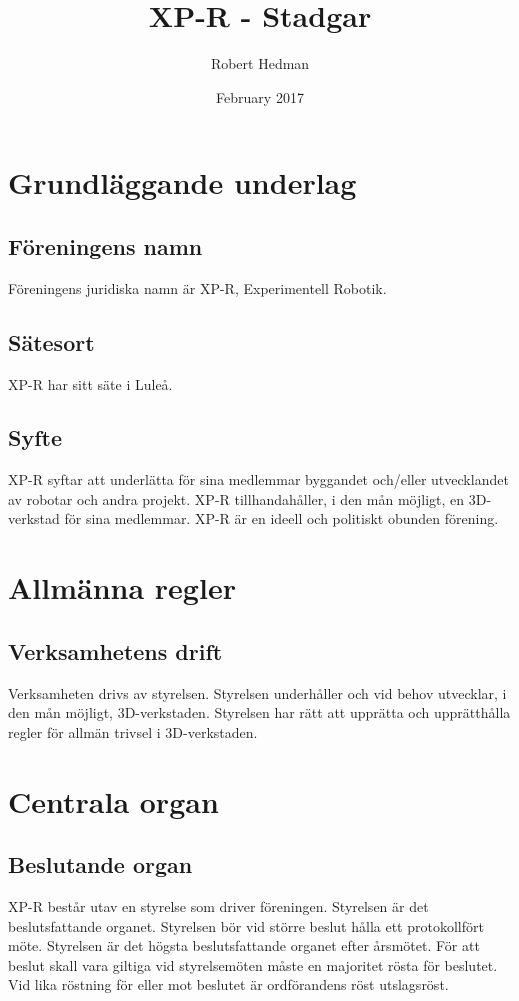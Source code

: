 \documentclass{article}
\title{XP-R - Stadgar}
\author{Robert Hedman}
\date{February 2017}
\begin{document}
\maketitle

\newpage

\tableofcontents

\newpage

\section{Grundläggande underlag}


\subsection{Föreningens namn}
Föreningens juridiska namn är XP-R, Experimentell Robotik.

\subsection{Sätesort}

XP-R har sitt säte i Luleå.

\subsection{Syfte}

XP-R syftar att underlätta för sina medlemmar byggandet och/eller utvecklandet av robotar och andra projekt.
XP-R tillhandahåller, i den mån möjligt, en 3D-verkstad för sina medlemmar.
XP-R är en ideell och politiskt obunden förening.

\section{Allmänna regler}

\subsection{Verksamhetens drift}
Verksamheten drivs av styrelsen. Styrelsen underhåller och vid behov utvecklar, i den mån möjligt, 3D-verkstaden. Styrelsen har rätt att upprätta och upprätthålla regler för allmän trivsel i 3D-verkstaden.


\section{Centrala organ}
\subsection{Beslutande organ}
XP-R består utav en styrelse som driver föreningen. Styrelsen är det beslutsfattande organet. Styrelsen bör vid större beslut hålla ett protokollfört möte. Styrelsen är det högsta beslutsfattande organet efter årsmötet.  För att beslut skall vara giltiga vid styrelsemöten måste en majoritet rösta för beslutet. Vid lika röstning för eller mot beslutet är ordförandens röst utslagsröst.
\end{document}
